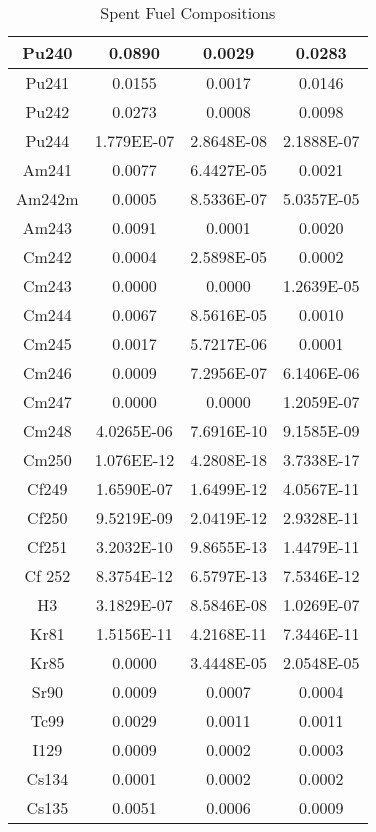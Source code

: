 \begin{table}[h]
{\begin{tabular}{|c|c|c|c|}
Pu240	 & 	0.0890& 	0.0029 & 	0.0283 \\ \hline 
Pu241	 & 	0.0155& 	0.0017 & 	0.0146 \\ \hline 
Pu242	 & 	0.0273& 	0.0008 & 	0.0098 \\ \hline 
Pu244	 & 	1.779EE-07& 	2.8648E-08 & 	2.1888E-07 \\ \hline 
Am241	 & 	0.0077& 	6.4427E-05 & 	0.0021 \\ \hline 
Am242m	 & 	0.0005& 	8.5336E-07 & 	5.0357E-05 \\ \hline 
Am243	 & 	0.0091& 	0.0001 & 	0.0020 \\ \hline 
Cm242	 & 	0.0004& 	2.5898E-05 & 	0.0002 \\ \hline 
Cm243	 & 	0.0000& 	0.0000 & 	1.2639E-05 \\ \hline 
Cm244	 & 	0.0067& 	8.5616E-05 & 	0.0010 \\ \hline 
Cm245	 & 	0.0017& 	5.7217E-06 & 	0.0001 \\ \hline 
Cm246	 & 	0.0009& 	7.2956E-07 & 	6.1406E-06 \\ \hline 
Cm247	 & 	0.0000& 	0.0000 & 	1.2059E-07 \\ \hline 
Cm248	 & 	4.0265E-06& 	7.6916E-10 & 	9.1585E-09 \\ \hline 
Cm250	 & 	1.076EE-12& 	4.2808E-18 & 	3.7338E-17 \\ \hline 
Cf249	 & 	1.6590E-07& 	1.6499E-12 & 	4.0567E-11 \\ \hline 
Cf250	 & 	9.5219E-09& 	2.0419E-12 & 	2.9328E-11 \\ \hline 
Cf251	 & 	3.2032E-10& 	9.8655E-13 & 	1.4479E-11 \\ \hline 
Cf 252	 & 	8.3754E-12& 	6.5797E-13 & 	7.5346E-12 \\ \hline 
H3	 & 	3.1829E-07& 	8.5846E-08 & 	1.0269E-07 \\ \hline 
Kr81	 & 	1.5156E-11& 	4.2168E-11 & 	7.3446E-11 \\ \hline 
Kr85	 & 	0.0000& 	3.4448E-05 & 	2.0548E-05 \\ \hline 
Sr90	 & 	0.0009& 	0.0007 & 	0.0004 \\ \hline 
Tc99	 & 	0.0029& 	0.0011 & 	0.0011 \\ \hline 
I129	 & 	0.0009& 	0.0002 & 	0.0003 \\ \hline 
Cs134	 & 	0.0001& 	0.0002 & 	0.0002 \\ \hline 
Cs135	 & 	0.0051& 	0.0006 & 	0.0009 \\ \hline 	

		\end{tabular}}
		\caption{Spent Fuel Compositions}
		\label{tab:comp}
\end {table}
